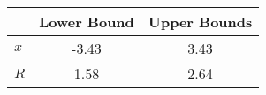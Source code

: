 \begin{tiny}\begin{tabular}{|l|c|c|}
\hline
&\textbf{Lower Bound}&\textbf{Upper Bounds}\\\hline
\textbf{$x$}&-3.43&3.43\\\hline
\textbf{$R$}&1.58&2.64\\\hline
\end{tabular}
\end{tiny}